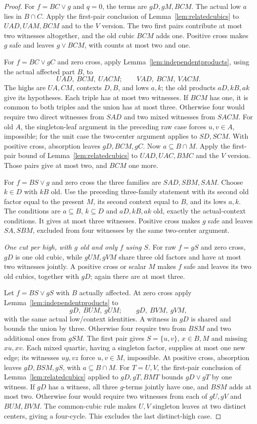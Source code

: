 \documentclass[11pt]{article}
\theoremstyle{definition}
\theoremstyle{remark}
\begin{document}
\begin{proof}
For $f=BC\vee g$ and $q=0$, the terms are $gD,gM,BCM$.
The actual low $a$ lies in $B\cap C$. Apply the first-pair conclusion
of Lemma~\ref{lem:relatedcubics} to $UAD,UAM,BCM$ and to the $V$
version. The two first pairs contribute at most two witnesses altogether,
and the old cubic $BCM$ adds one. Positive cross makes $g$ safe and leaves
$g\vee BCM$, with counts at most two and one.

For $f=BC\vee gC$ and zero cross, apply
Lemma~\ref{lem:independentproducts}, using the actual affected part $B$,
to
\[
 UAD,\ BCM,\ UACM;\qquad VAD,\ BCM,\ VACM.
\]
The highs are $UA,CM$, contexts $D,B$, and lows $a,k$; the old products
$aD,kB,ak$ give its hypotheses. Each triple has at most two witnesses.
If $BCM$ has one, it is common to both triples and the union has at most
three. Otherwise four would require two direct witnesses from $SAD$ and
two mixed witnesses from $SACM$. For old $A$, the singleton-leaf argument
in the preceding raw case forces $u,v\in A$, impossible; for the unit
case the two-center argument applies to $SD,SCM$.
With positive cross, absorption leaves $gD,BCM,gC$. Now $a\subseteq
B\cap M$. Apply the first-pair bound of Lemma~\ref{lem:relatedcubics}
to $UAD,UAC,BMC$ and the $V$ version. Those pairs give at most two, and
$BCM$ one more.

For $f=BS\vee g$ and zero cross the three families are
$SAD,SBM,SAM$. Choose $k\in D$ with $kB$ old. Use the preceding
three-family statement with its second old factor equal to the present
$M$, its second context equal to $B$, and its lows $a,k$.
The conditions are $a\subseteq B$, $k\subseteq D$ and $aD,kB,ak$
old, exactly the actual-context conditions. It gives at most three
witnesses. Positive cross makes $g$ safe and leaves $SA,SBM$, excluded
from four witnesses by the same two-center argument.

\emph{One cut per high, with $g$ old and only $f$ using $S$.}
For raw $f=gS$ and zero cross, $gD$ is one old cubic, while $gUM,gVM$
share three old factors and have at most two witnesses jointly.
A positive cross or scalar $M$ makes $f$ safe and leaves its two old
cubics, together with $gD$; again there are at most three.

Let $f=BS\vee gS$ with $B$ actually affected. At zero cross apply
Lemma~\ref{lem:independentproducts} to
\[
 gD,\ BUM,\ gUM;\qquad gD,\ BVM,\ gVM,
\]
with the same actual low/context identities. A witness in $gD$ is shared
and bounds the union by three. Otherwise four require two from $BSM$
and two additional ones from $gSM$. The first pair gives
$S=\{u,v\}$, $x\in B,M$ and missing $xu,xv$.
Each mixed quartic, having a singleton factor, supplies at most one new
edge; its witnesses $uy,vz$ force $u,v\in M$, impossible.
At positive cross, absorption leaves $gD,BSM,gS$, with
$a\subseteq B\cap M$. For $T=U,V$, the first-pair conclusion of
Lemma~\ref{lem:relatedcubics} applied to $gD,gT,BMT$ bounds
$gD\vee gT$ by one witness. If $gD$ has a witness, all three $g$-terms
jointly have one, and $BSM$ adds at most two. Otherwise four would
require two witnesses from each of $gU,gV$ and $BUM,BVM$.
The common-cubic rule makes $U,V$ singleton leaves at two distinct
centers, giving a four-cycle. This excludes the last distinct-high case.


\end{proof}
\end{document}
